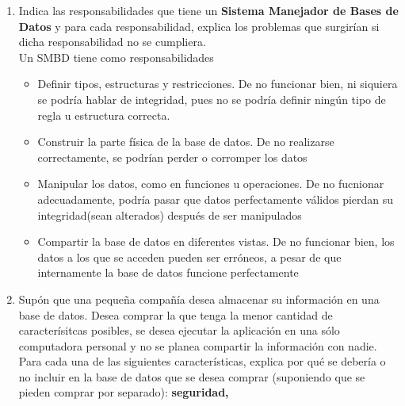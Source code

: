 \documentclass{article}
\begin{document}
\begin{enumerate}[label=\alph*.]
\begin{itemize}
{                1971 por la INS y la ANSI}
                \item {Primeras aplicaciones de internet que acceen a bases de
                datos}
                \item {XML: se utiliza para procesar las bases de datos para 
                resolver problemas varios}
            \end{itemize}
        \item {
            Indica las responsabilidades que tiene un \textbf{Sistema Manejador
            de Bases de Datos} y para cada responsabilidad, explica los problemas
            que surgirían si dicha responsabilidad no se cumpliera. \\
            Un SMBD tiene como responsabilidades
            \begin{itemize}
                \item {Definir tipos, estructuras y restricciones. De no 
                funcionar bien, ni siquiera se podría hablar de integridad, pues
                no se podría definir ningún tipo de regla u estructura correcta.}
                \item {Construir la parte física de la base de datos. De no 
                realizarse correctamente, se podrían perder o corromper los datos}
                \item {Manipular los datos, como en funciones u operaciones. De
                no fucnionar adecuadamente, podría pasar que datos perfectamente
                válidos pierdan su integridad(sean alterados) después de ser 
                manipulados}
                \item {Compartir la base de datos en diferentes vistas. De no 
                funcionar bien, los datos a los que se acceden pueden ser erróneos,
                a pesar de que internamente la base de datos funcione 
                perfectamente}
            \end{itemize}
        }
        \item {
            Supón que una pequeña compañía desea almacenar su información en una
            base de datos. Desea comprar la que tenga la menor cantidad de 
            caracterísitcas posibles, se desea ejecutar la aplicación en una 
            sólo computadora personal y no se planea compartir la información con
            nadie. Para cada una de las siguientes características, explica por
            qué se debería o no incluir en la base de datos que se desea comprar
            (suponiendo que se pieden comprar por separado): \textbf{seguridad, 
}}
\end{enumerate}
\end{document}
